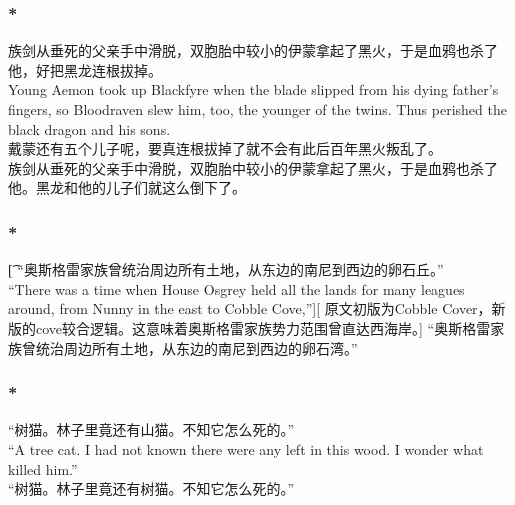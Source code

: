 \documentclass[12pt,a4paper]{article}
\newcommand{\h}[1]{{\color{red}#1}\\}
\newcommand{\la}[1]{{\color{blue}#1}\\}
\begin{document}
\subsubsection{\color{red}*}\la{
	族剑从垂死的父亲手中滑脱，双胞胎中较小的伊蒙拿起了黑火，于是血鸦也杀了他，好把黑龙连根拔掉。\\
	Young Aemon took up Blackfyre when the blade slipped from his dying father's fingers, so Bloodraven slew him, too, the younger of the twins. Thus perished the black dragon and his sons.}\h{
	戴蒙还有五个儿子呢，要真连根拔掉了就不会有此后百年黑火叛乱了。}
	族剑从垂死的父亲手中滑脱，双胞胎中较小的伊蒙拿起了黑火，于是血鸦也杀了他。黑龙和他的儿子们就这么倒下了。
	
\subsubsection{\color{red}*}\t[	
	“奥斯格雷家族曾统治周边所有土地，从东边的南尼到西边的卵石丘。”\\
	“There was a time when House Osgrey held all the lands for many leagues around, from Nunny in the east to Cobble Cove,”][
	原文初版为Cobble Cover，新版的cove较合逻辑。这意味着奥斯格雷家族势力范围曾直达西海岸。]
	“奥斯格雷家族曾统治周边所有土地，从东边的南尼到西边的卵石湾。”
	
\subsubsection{\color{red}*}\la{
	“树猫。林子里竟还有山猫。不知它怎么死的。”\\
	“A tree cat. I had not known there were any left in this wood. I wonder what killed him.” }
	“树猫。林子里竟还有树猫。不知它怎么死的。”
	
\end{document}
